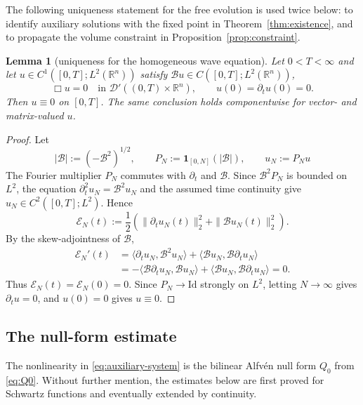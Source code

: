 \documentclass[11pt,reqno]{amsart}
\theoremstyle{plain}
\newtheorem{lemma}[theorem]{Lemma}
\theoremstyle{definition}
\theoremstyle{remark}
\numberwithin{equation}{section}
\newcommand{\Real}{\mathbb R}
\newcommand{\Rn}{\Real^n}
\begin{document}
The following uniqueness statement for the free evolution is used twice
below: to identify auxiliary solutions with the fixed point in
Theorem~\ref{thm:existence}, and to propagate the volume constraint in
Proposition~\ref{prop:constraint}.

\begin{lemma}[uniqueness for the homogeneous wave equation]\label{lem:wave-uniqueness}
Let $0<T<\infty$ and let $u\in C^1([0,T];L^2(\Rn))$ satisfy
$\mathcal Bu\in C([0,T];L^2(\Rn))$,
\[
 \Box u=0\quad\text{in }\mathcal D'((0,T)\times\Rn),
 \qquad
 u(0)=\partial_tu(0)=0 .
\]
Then $u\equiv0$ on $[0,T]$. The same conclusion holds componentwise for
vector- and matrix-valued $u$.
\end{lemma}

\begin{proof}
Let
\[
 |\mathcal B|:=(-\mathcal B^2)^{1/2},
 \qquad P_N:=\mathbf 1_{[0,N]}(|\mathcal B|),
 \qquad
 u_N:=P_Nu
\]
The Fourier multiplier $P_N$ commutes with $\partial_t$ and $\mathcal B$.
Since $\mathcal B^2P_N$ is bounded on $L^2$, the equation
$\partial_t^2u_N=\mathcal B^2u_N$ and the assumed time continuity give
$u_N\in C^2([0,T];L^2)$. Hence
\[
 \mathcal E_N(t):=\frac12\left(
   \|\partial_tu_N(t)\|_2^2
   +\|\mathcal Bu_N(t)\|_2^2
 \right).
\]
By the skew-adjointness of $\mathcal B$,
\begin{align*}
 \mathcal E_N'(t)
 &=\langle\partial_tu_N,\mathcal B^2u_N\rangle
   +\langle\mathcal Bu_N,\mathcal B\partial_tu_N\rangle\\
 &=-\langle\mathcal B\partial_tu_N,\mathcal Bu_N\rangle
   +\langle\mathcal Bu_N,\mathcal B\partial_tu_N\rangle
 =0.
\end{align*}
Thus $\mathcal E_N(t)=\mathcal E_N(0)=0$. Since $P_N\to\mathrm{Id}$ strongly
on $L^2$, letting $N\to\infty$ gives $\partial_tu=0$, and $u(0)=0$ gives
$u\equiv0$.
\end{proof}

\subsection{The null-form estimate}
\label{ssec:null-form}

The nonlinearity in \eqref{eq:auxiliary-system} is the bilinear Alfv\'en null form $Q_0$ from \eqref{eq:Q0}. Without further mention, the estimates below are first proved for Schwartz functions and eventually extended by continuity.
\end{document}
